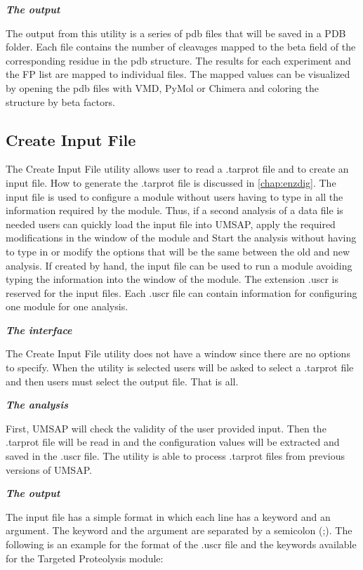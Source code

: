 \textit{\textbf{The output}}

The output from this utility is a series of pdb files that will be saved in a PDB folder. Each file contains the number of cleavages mapped to the beta field of the corresponding residue in the pdb structure. The results for each experiment and the FP list are mapped to individual files. The mapped values can be visualized by opening the pdb files with VMD, PyMol or Chimera and coloring the structure by beta factors.

\subsection{Create Input File}
\label{subsec:uscrfile}

The Create Input File utility allows user to read a .tarprot file and to create an input file. How to generate the .tarprot file is discussed in \autoref{chap:enzdig}. The input file is used to configure a module without users having to type in all the information required by the module. Thus, if a second analysis of a data file is needed users can quickly load the input file into UMSAP, apply the required modifications in the window of the module and Start the analysis without having to type in or modify the options that will be the same between the old and new analysis. If created by hand, the input file can be used to run a module avoiding typing the information into the window of the module. The extension .uscr is reserved for the input files. Each .uscr file can contain information for configuring one module for one analysis.

\textit{\textbf{The interface}}

The Create Input File utility does not have a window since there are no options to specify. When the utility is selected users will be asked to select a .tarprot file and then users must select the output file. That is all.

\textit{\textbf{The analysis}}

First, UMSAP will check the validity of the user provided input. Then the .tarprot file will be read in and the configuration values will be extracted and saved in the .uscr file. The utility is able to process .tarprot files from previous versions of UMSAP.

\textit{\textbf{The output}}

The input file has a simple format in which each line has a keyword and an argument. The keyword and the argument are separated by a semicolon (;). The following is an example for the format of the .uscr file and the keywords available for the Targeted Proteolysis module:

